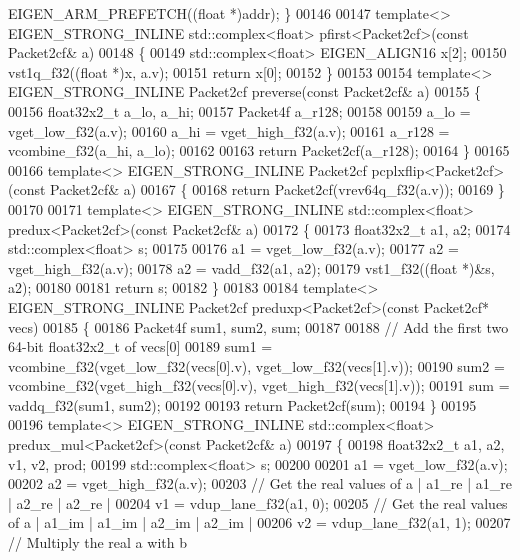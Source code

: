 \begin{DoxyCode}
      EIGEN\_ARM\_PREFETCH((\textcolor{keywordtype}{float} *)addr); \}
00146 
00147 \textcolor{keyword}{template}<> EIGEN\_STRONG\_INLINE std::complex<float>  pfirst<Packet2cf>(\textcolor{keyword}{const} Packet2cf& a)
00148 \{
00149   std::complex<float> EIGEN\_ALIGN16 x[2];
00150   vst1q\_f32((\textcolor{keywordtype}{float} *)x, a.v);
00151   \textcolor{keywordflow}{return} x[0];
00152 \}
00153 
00154 \textcolor{keyword}{template}<> EIGEN\_STRONG\_INLINE Packet2cf preverse(\textcolor{keyword}{const} Packet2cf& a)
00155 \{
00156   float32x2\_t a\_lo, a\_hi;
00157   Packet4f a\_r128;
00158 
00159   a\_lo = vget\_low\_f32(a.v);
00160   a\_hi = vget\_high\_f32(a.v);
00161   a\_r128 = vcombine\_f32(a\_hi, a\_lo);
00162 
00163   \textcolor{keywordflow}{return} Packet2cf(a\_r128);
00164 \}
00165 
00166 \textcolor{keyword}{template}<> EIGEN\_STRONG\_INLINE Packet2cf pcplxflip<Packet2cf>(\textcolor{keyword}{const} Packet2cf& a)
00167 \{
00168   \textcolor{keywordflow}{return} Packet2cf(vrev64q\_f32(a.v));
00169 \}
00170 
00171 \textcolor{keyword}{template}<> EIGEN\_STRONG\_INLINE std::complex<float> predux<Packet2cf>(\textcolor{keyword}{const} Packet2cf& a)
00172 \{
00173   float32x2\_t a1, a2;
00174   std::complex<float> s;
00175 
00176   a1 = vget\_low\_f32(a.v);
00177   a2 = vget\_high\_f32(a.v);
00178   a2 = vadd\_f32(a1, a2);
00179   vst1\_f32((\textcolor{keywordtype}{float} *)&s, a2);
00180 
00181   \textcolor{keywordflow}{return} s;
00182 \}
00183 
00184 \textcolor{keyword}{template}<> EIGEN\_STRONG\_INLINE Packet2cf preduxp<Packet2cf>(\textcolor{keyword}{const} Packet2cf* vecs)
00185 \{
00186   Packet4f sum1, sum2, sum;
00187 
00188   \textcolor{comment}{// Add the first two 64-bit float32x2\_t of vecs[0]}
00189   sum1 = vcombine\_f32(vget\_low\_f32(vecs[0].v), vget\_low\_f32(vecs[1].v));
00190   sum2 = vcombine\_f32(vget\_high\_f32(vecs[0].v), vget\_high\_f32(vecs[1].v));
00191   sum = vaddq\_f32(sum1, sum2);
00192 
00193   \textcolor{keywordflow}{return} Packet2cf(sum);
00194 \}
00195 
00196 \textcolor{keyword}{template}<> EIGEN\_STRONG\_INLINE std::complex<float> predux\_mul<Packet2cf>(\textcolor{keyword}{const} Packet2cf& a)
00197 \{
00198   float32x2\_t a1, a2, v1, v2, prod;
00199   std::complex<float> s;
00200 
00201   a1 = vget\_low\_f32(a.v);
00202   a2 = vget\_high\_f32(a.v);
00203    \textcolor{comment}{// Get the real values of a | a1\_re | a1\_re | a2\_re | a2\_re |}
00204   v1 = vdup\_lane\_f32(a1, 0);
00205   \textcolor{comment}{// Get the real values of a | a1\_im | a1\_im | a2\_im | a2\_im |}
00206   v2 = vdup\_lane\_f32(a1, 1);
00207   \textcolor{comment}{// Multiply the real a with b}

\end{DoxyCode}
